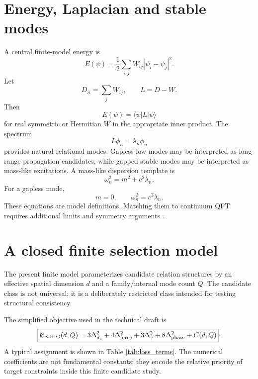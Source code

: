 \documentclass[11pt,a4paper]{article}
\newcommand{\Etot}{\mathfrak{E}_{\mathrm{B\text{-}HIG}}}
\begin{document}
\section{Energy, Laplacian and stable modes}
A central finite-model energy is
\begin{equation}
\boxed{E(\psi)=\frac{1}{2}\sum_{i,j}W_{ij}|\psi_i-\psi_j|^2} .
\label{eq:energy}
\end{equation}
Let
\begin{equation}
D_{ii}=\sum_j W_{ij}, \qquad \boxed{L=D-W} .
\label{eq:laplacian}
\end{equation}
Then
\begin{equation}
\boxed{E(\psi)=\langle \psi|L|\psi\rangle}
\end{equation}
for real symmetric or Hermitian $W$ in the appropriate inner product. The spectrum
\begin{equation}
\boxed{L\phi_n=\lambda_n\phi_n}
\label{eq:spectrum}
\end{equation}
provides natural relational modes. Gapless low modes may be interpreted as long-range propagation candidates, while gapped stable modes may be interpreted as mass-like excitations. A mass-like dispersion template is
\begin{equation}
\boxed{\omega_n^2=m^2+c^2\lambda_n} .
\label{eq:massive_dispersion}
\end{equation}
For a gapless mode,
\begin{equation}
\boxed{m=0, \qquad \omega_n^2=c^2\lambda_n} .
\end{equation}
These equations are model definitions. Matching them to continuum QFT requires additional limits and symmetry arguments \cite{PeskinSchroeder1995}.

\section{A closed finite selection model}
The present finite model parameterizes candidate relation structures by an effective spatial dimension $d$ and a family/internal mode count $Q$. The candidate class is not universal; it is a deliberately restricted class intended for testing structural consistency.

The simplified objective used in the technical draft is
\begin{equation}
\boxed{
\Etot(d,Q)=3\Delta_{d_s}^2+4\Delta_{\rm force}^2+3\Delta_{\gamma}^2+8\Delta_{\rm phase}^2+C(d,Q)
} .
\label{eq:finite_loss}
\end{equation}
A typical assignment is shown in Table \ref{tab:loss_terms}. The numerical coefficients are not fundamental constants; they encode the relative priority of target constraints inside this finite candidate study.
\end{document}
